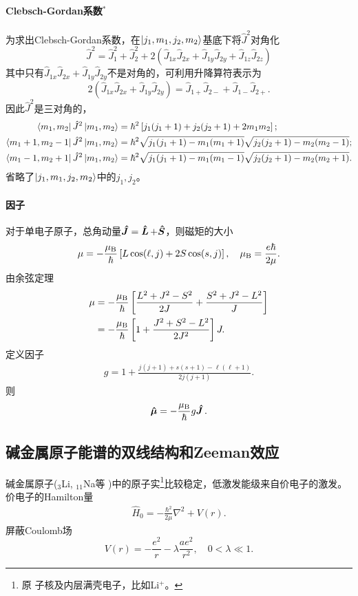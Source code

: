 \paragraph*{Clebsch-Gordan系数$^\ast$}为求出Clebsch-Gordan系数，在$\left\vert j_1,m_1,j_2,m_2\right\rangle$基底下将$\hat J^2$对角化
\[
	\hat J^2=\hat J_1^2+\hat J_2^2+2(\hat J_{1x}\hat J_{2x}+\hat J_{1y}\hat J_{2y}+\hat J_{1z}\hat J_{2z})
\]
其中只有$\hat J_{1x}\hat J_{2x}+\hat J_{1y}\hat J_{2y}$不是对角的，可利用升降算符表示为
\[
2(\hat J_{1x}\hat J_{2x}+\hat J_{1y}\hat J_{2y})=\hat J_{1+}\hat J_{2-}+\hat J_{1-}\hat J_{2+}.
\]
因此$\hat J^2$是三对角的，
{\footnotesize
\begin{align*}
	\left\langle m_1,m_2\right\vert\hat J^2\left\vert m_1,m_2\right\rangle&=\hbar^2\left[j_1(j_1+1)+j_2(j_2+1)+2m_1m_2\right];\\
	\left\langle m_1+1,m_2-1\right\vert\hat J^2\left\vert m_1,m_2\right\rangle&=\hbar^2\sqrt{j_1(j_1+1)-m_1(m_1+1)}\sqrt{j_2(j_2+1)-m_2(m_2-1)};\\
	\left\langle m_1-1,m_2+1\right\vert\hat J^2\left\vert m_1,m_2\right\rangle&=\hbar^2\sqrt{j_1(j_1+1)-m_1(m_1-1)}\sqrt{j_2(j_2+1)-m_2(m_2+1)}.
\end{align*}
}
省略了$\left\vert j_1,m_1,j_2,m_2\right\rangle$中的$j_1,j_2$。
\paragraph*{\Lande 因子}对于单电子原子，总角动量$\bm{\hat J}\!\mathop{}=\bm{\hat L}\!\mathop{}+\bm{\hat S}\!\mathop{}$，则磁矩的大小
\[
	\mu=-\frac{\mu_\mathrm B}\hbar\left[L\cos(\ell,j)+2S\cos(s,j)\right],\quad\mu_\mathrm B=\frac{e\hbar}{2\mu}.
\]
由余弦定理
\begin{align*}
	\mu&=-\frac{\mu_\mathrm B}\hbar\left[\frac{L^2+J^2-S^2}{2J}+\frac{S^2+J^2-L^2}J\right]\\
	&=-\frac{\mu_\mathrm B}\hbar\left[1+\frac{J^2+S^2-L^2}{2J^2}\right]J.
\end{align*}
定义\Lande 因子 
\begin{align}
	g=1+\frac{j(j+1)+s(s+1)-\ell(\ell+1)}{2j(j+1)}.
\end{align}
则
\[
	\bm{\hat \mu}\!\mathop{}=-\frac{\mu_\mathrm B}\hbar g\bm{\hat J}\!\mathop{}.
\]
\clearpage
\subsection{碱金属原子能谱的双线结构和Zeeman效应}
碱金属原子($_3$Li, $_{11}$Na等%
)中的原子实\footnote{原
子核及内层满壳电子，比如Li$^+$。}比较稳定，低激发能级来自价电子的激发。价电子的Hamilton量
\begin{align}
	\hat H_0=-\frac{\hbar^2}{2\mu}\nabla^2+V(r).
\end{align}
屏蔽Coulomb场
\[
V(r)=-\frac{e^2}r-\lambda\frac{ae^2}{r^2},\quad 0<\lambda\ll 1.
\]


